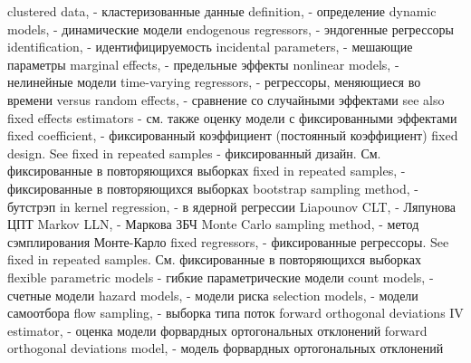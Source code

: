 clustered data, - кластеризованные данные
definition, - определение
dynamic models, - динамические модели
endogenous regressors, - эндогенные регрессоры
identification, - идентифицируемость
incidental parameters, - мешающие параметры
marginal effects, - предельные эффекты
nonlinear models, - нелинейные модели
time-varying regressors, - регрессоры, меняющиеся во времени
versus random effects, - сравнение со случайными эффектами
see also fixed effects estimators - см. также оценку модели с фиксированными эффектами
fixed coefficient, - фиксированный коэффициент (постоянный коэффициент)
fixed design. See fixed in repeated samples - фиксированный дизайн. См. фиксированные в повторяющихся выборках
fixed in repeated samples, - фиксированные в повторяющихся выборках
bootstrap sampling method, - бутстрэп 
in kernel regression, - в ядерной регрессии
Liapounov CLT, - Ляпунова ЦПТ
Markov LLN, - Маркова ЗБЧ
Monte Carlo sampling method, - метод сэмплирования Монте-Карло
fixed regressors, - фиксированные регрессоры. See fixed in repeated samples. См. фиксированные в повторяющихся выборках
flexible parametric models - гибкие параметрические модели
count models, - счетные модели
hazard models, - модели риска
selection models, - модели самоотбора
flow sampling, - выборка типа поток
forward orthogonal deviations IV estimator, - оценка модели форвардных ортогональных отклонений
forward orthogonal deviations model, - модель форвардных ортогональных отклонений

